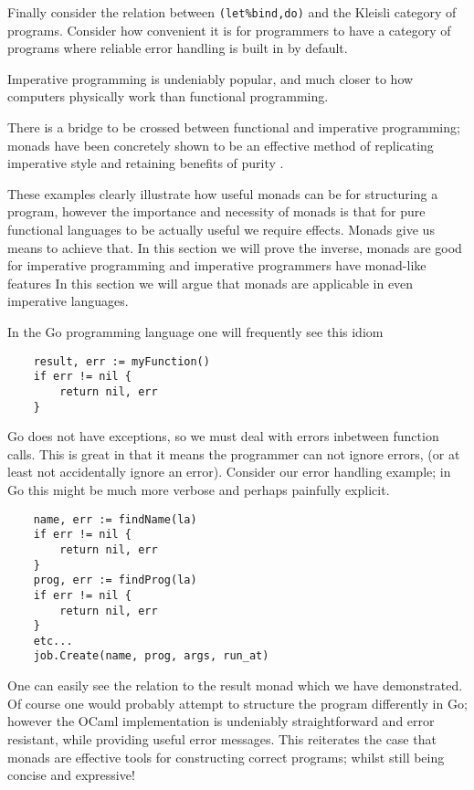 Finally consider the relation between
\texttt{(let\%bind,do)} and the Kleisli category of programs.
Consider how convenient  it is for programmers to have a category
of programs where reliable error handling is built in by default.

Imperative programming is undeniably popular,
and much closer to how computers physically work than functional programming.



There is a bridge to be crossed between functional and imperative programming;
monads have been concretely shown to be an effective method of replicating
imperative style and retaining benefits of purity \cite{PeytonJones:1993}.

These examples clearly illustrate how useful monads can be for structuring a program,
however the importance and necessity of monads is that for pure functional languages
to be actually useful we require effects. Monads give us means to achieve that.
In this section we will prove the inverse,
monads are good for imperative programming
and imperative programmers have monad-like features
In this section we will argue that monads are applicable
in even imperative languages.


In the Go programming language one will frequently see this idiom
\begin{verbatim}
    result, err := myFunction()
    if err != nil {
        return nil, err
    }
\end{verbatim}

Go does not have exceptions,
so we must deal with errors inbetween function calls.
This is great in that it means the programmer can not
ignore errors, (or at least not accidentally ignore an error).
Consider our error handling example;
in Go this might be much more verbose
and perhaps painfully explicit.

\begin{verbatim}
    name, err := findName(la)
    if err != nil {
        return nil, err
    }
    prog, err := findProg(la)
    if err != nil {
        return nil, err
    }
    etc...
    job.Create(name, prog, args, run_at)
\end{verbatim}

One can easily see the relation to the result monad which we have demonstrated.
Of course one would probably attempt to structure the program differently in Go;
however the OCaml implementation is undeniably straightforward
and error resistant, while providing useful error messages.
This reiterates the case that monads are effective tools
for constructing correct programs;
whilst still being concise and expressive!

